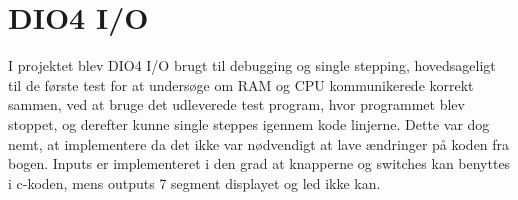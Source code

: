 \section{DIO4 I/O}
I projektet blev DIO4 I/O brugt til debugging og single stepping, hovedsageligt til de første test for at undersøge om RAM og CPU kommunikerede korrekt sammen, ved at bruge det udleverede test program, hvor programmet blev stoppet, og derefter kunne single steppes igennem kode linjerne. Dette var dog nemt, at implementere da det ikke var nødvendigt at lave ændringer på koden fra bogen. %
Inputs er implementeret i den grad at knapperne og switches kan benyttes i c-koden, mens outputs 7 segment displayet og led ikke kan.